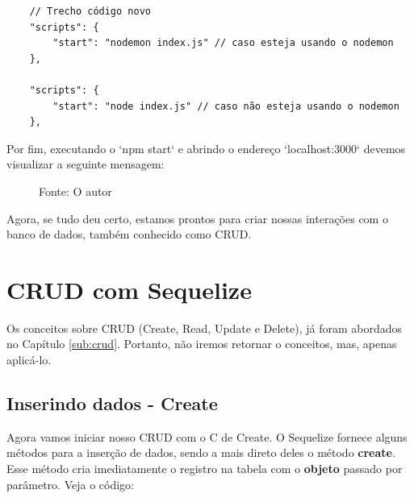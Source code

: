 \begin{verbatim}
	// Trecho código novo
	"scripts": {
		"start": "nodemon index.js" // caso esteja usando o nodemon
	},
	
	"scripts": {
		"start": "node index.js" // caso não esteja usando o nodemon
	},
\end{verbatim}

Por fim, executando o `npm start` e abrindo o endereço `localhost:3000` devemos visualizar a seguinte mensagem:

\begin{figure}[H]
	\centering
	\caption{
		Fonte: O autor
	}
	\label{fig:olamundo}
\end{figure}

Agora, se tudo deu certo, estamos prontos para criar nossas interações com o banco de dados, também conhecido como CRUD.

\section{CRUD com Sequelize}\label{sec:crudsequelize}

Os conceitos sobre CRUD (Create, Read, Update e Delete), já foram abordados no Capítulo \ref{sub:crud}. Portanto, não iremos retornar o conceitos, mas, apenas aplicá-lo.

\subsection{Inserindo dados - Create}

Agora vamos iniciar nosso CRUD com o C de Create. O Sequelize fornece alguns métodos para a inserção de dados, sendo a mais direto deles o método \textbf{create}. Esse método cria imediatamente o registro na tabela com o \textbf{objeto} passado por parâmetro. Veja o código:

